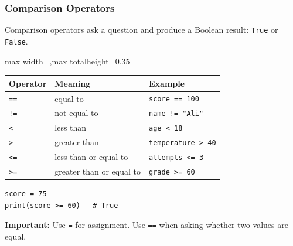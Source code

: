 \documentclass[aspectratio=169,10pt]{beamer}
\newcommand{\keyword}[1]{\textcolor{PrimaryBlue}{\textbf{#1}}}
\begin{document}
\begin{frame}[fragile]
\frametitle{Comparison Operators}
\begin{tcolorbox}[lecturebox,title=Key idea]
Comparison operators ask a question and produce a Boolean result: \texttt{True} or \texttt{False}.
\end{tcolorbox}

\small
\begin{adjustbox}{max width=\textwidth,max totalheight=0.35\textheight}
\begin{tabular}{@{}p{1.6cm}p{4.4cm}p{5.3cm}@{}}
\toprule
\textbf{Operator} & \textbf{Meaning} & \textbf{Example} \\
\midrule
\texttt{==} & equal to & \texttt{score == 100} \\
\texttt{!=} & not equal to & \texttt{name != "Ali"} \\
\texttt{<} & less than & \texttt{age < 18} \\
\texttt{>} & greater than & \texttt{temperature > 40} \\
\texttt{<=} & less than or equal to & \texttt{attempts <= 3} \\
\texttt{>=} & greater than or equal to & \texttt{grade >= 60} \\
\bottomrule
\end{tabular}
\end{adjustbox}

\begin{lstlisting}[style=pycodesmall]
score = 75
print(score >= 60)   # True
\end{lstlisting}

{\small \keyword{Important:} Use \texttt{=} for assignment. Use \texttt{==} when asking whether two values are equal.}
\end{frame}
\end{document}
